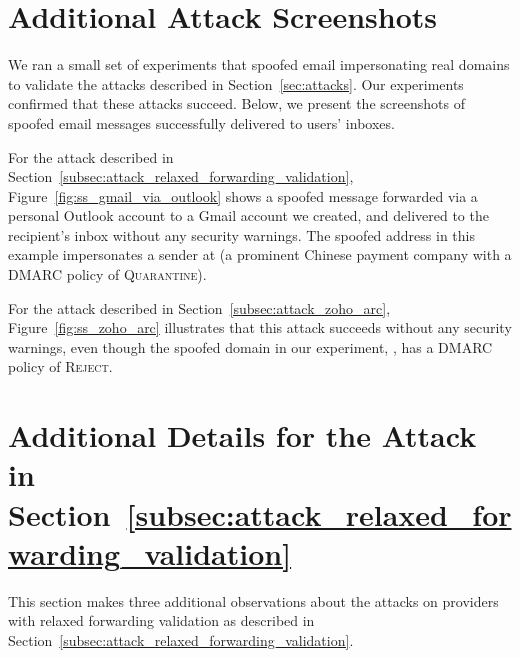 

\section{Additional Attack Screenshots}
We ran a small set of experiments that spoofed email impersonating real domains to validate the attacks described in Section~\ref{sec:attacks}.
Our experiments confirmed that these attacks succeed.
Below, we present the screenshots of spoofed email messages successfully delivered to users' inboxes.

For the attack described in Section~\ref{subsec:attack_relaxed_forwarding_validation}, Figure~\ref{fig:ss_gmail_via_outlook} shows a spoofed message forwarded via a personal Outlook account to a Gmail account we created, and delivered to the recipient's inbox without any security warnings.
The spoofed address in this example impersonates a sender at  (a prominent Chinese payment company with a DMARC policy of \textsc{Quarantine}).

For the attack described in Section~\ref{subsec:attack_zoho_arc}, Figure~\ref{fig:ss_zoho_arc} illustrates that this attack succeeds
without any security warnings, even though the spoofed domain in our
experiment, , has a DMARC policy of \textsc{Reject}.


\section{Additional Details for the Attack in Section~\ref{subsec:attack_relaxed_forwarding_validation}}
\label{sec:append_change_behavior_details}
This section makes three additional observations about the attacks on
providers with relaxed forwarding validation as described in
Section~\ref{subsec:attack_relaxed_forwarding_validation}.

